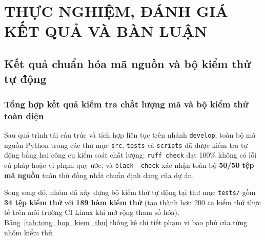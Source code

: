 
\chapter{THỰC NGHIỆM, ĐÁNH GIÁ KẾT QUẢ VÀ BÀN LUẬN}
\label{chap:thuc_nghiem}

\section{Kết quả chuẩn hóa mã nguồn và bộ kiểm thử tự động}
\label{sec:ket_qua_kiem_thu}

\subsection{Tổng hợp kết quả kiểm tra chất lượng mã và bộ kiểm thử toàn diện}
\label{subsec:dac_ta_test}

Sau quá trình tái cấu trúc và tích hợp liên tục trên nhánh \texttt{develop}, toàn bộ mã nguồn Python trong các thư mục \texttt{src}, \texttt{tests} và \texttt{scripts} đã được kiểm tra tự động bằng hai công cụ kiểm soát chất lượng: \texttt{ruff check} đạt 100\% không có lỗi cú pháp hoặc vi phạm quy ước, và \texttt{black --check} xác nhận toàn bộ \textbf{50/50 tệp mã nguồn} tuân thủ đồng nhất chuẩn định dạng của dự án.

Song song đó, nhóm đã xây dựng bộ kiểm thử tự động tại thư mục \texttt{tests/} gồm \textbf{34 tệp kiểm thử} với \textbf{189 hàm kiểm thử} (tạo thành hơn 200 ca kiểm thử thực tế trên môi trường CI Linux khi mở rộng tham số hóa). Bảng~\ref{tab:tong_hop_kiem_thu} thống kê chi tiết phạm vi bao phủ của từng nhóm kiểm thử.

